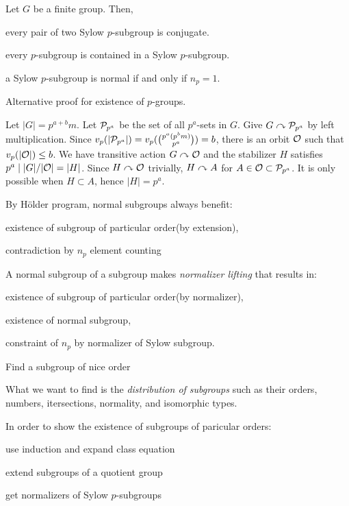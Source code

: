 \documentclass{../exp}
\begin{document}
\begin{cor}
Let $G$ be a finite group.
Then,
\begin{cond}
\item every pair of two Sylow $p$-subgroup is conjugate.
\item every $p$-subgroup is contained in a Sylow $p$-subgroup.
\item a Sylow $p$-subgroup is normal if and only if $n_p=1$.
\end{cond}
\end{cor}

\begin{thm}
Alternative proof for existence of $p$-groups.
\end{thm}
\begin{pf}
Let $|G|=p^{a+b}m$.
Let $\mathcal{P}_{p^a}$ be the set of all $p^a$-sets in $G$.
Give $G\curvearrowright\mathcal{P}_{p^a}$ by left multiplication.
Since $v_p(|\mathcal{P}_{p^a}|)=v_p({p^a(p^bm)\choose p^a})=b$, there is an orbit $\mathcal{O}$ such that $v_p(|\mathcal{O}|)\le b$.
We have transitive action $G\curvearrowright\mathcal{O}$ and the stabilizer $H$ satisfies $p^a\mid|G|/|\mathcal{O}|=|H|$.
Since $H\curvearrowright\mathcal{O}$ trivially, $H\curvearrowright A$ for $A\in\mathcal{O}\subset\mathcal{P}_{p^a}$.
It is only possible when $H\subset A$, hence $|H|=p^a$.
\end{pf}




By H\"older program, normal subgroups always benefit:
\begin{cond}
\item existence of subgroup of particular order(by extension),
\item contradiction by $n_p$ element counting
\end{cond}
A normal subgroup of a subgroup makes \emph{normalizer lifting} that results in:
\begin{cond}
\item existence of subgroup of particular order(by normalizer),
\item existence of normal subgroup,
\item constraint of $n_p$ by normalizer of Sylow subgroup.
\end{cond}

Find a subgroup of nice order


What we want to find is the \emph{distribution of subgroups} such as their orders, numbers, itersections, normality, and isomorphic types.


In order to show the existence of subgroups of paricular orders:
\begin{cond}
\item use induction and expand class equation
\item extend subgroups of a quotient group
\item get normalizers of Sylow $p$-subgroups
\end{cond}
\end{document}
